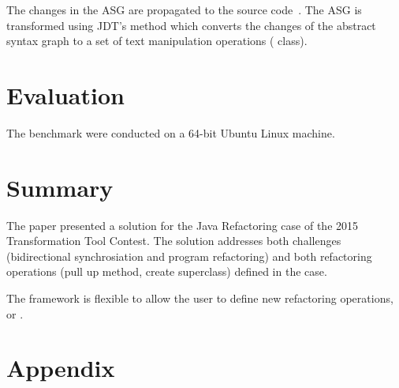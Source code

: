 \documentclass[submission,copyright,creativecommons]{eptcs}
\begin{document}
The changes in the ASG are propagated to the source code~. The ASG is transformed using JDT's  method which converts the changes of the abstract syntax graph to a set of text manipulation operations ( class).

\section{Evaluation}

The benchmark were conducted on a 64-bit Ubuntu Linux machine.


\section{Summary}

The paper presented a solution for the Java Refactoring case of the 2015 Transformation Tool Contest. The solution addresses both challenges (bidirectional synchrosiation and program refactoring) and both refactoring operations (pull up method, create superclass) defined in the case.

The framework is flexible to allow the user to define new refactoring operations, \eg {} or .




\clearpage

\appendix
\section{Appendix}


\end{document}
